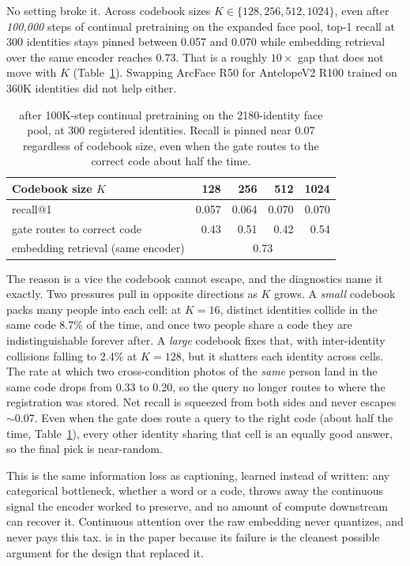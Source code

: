 No setting broke it. Across codebook sizes $K\in\{128,256,512,1024\}$, even after \emph{100{,}000} steps of continual pretraining on the expanded face pool, top-1 recall at 300 identities stays pinned between 0.057 and 0.070 while embedding retrieval over the same encoder reaches 0.73. That is a roughly $10\times$ gap that does not move with $K$ (Table~\ref{tab:patha}). Swapping ArcFace R50 for AntelopeV2 R100 trained on 360K identities did not help either.

\begin{table}[h]
\small\centering
\caption{\patha{} after 100K-step continual pretraining on the 2180-identity face pool, at 300 registered identities. Recall is pinned near 0.07 regardless of codebook size, even when the gate routes to the correct code about half the time.}
\label{tab:patha}
\begin{tabular}{@{}lrrrr@{}}
\toprule
\textbf{Codebook size $K$} & 128 & 256 & 512 & 1024 \\
\midrule
\patha{} recall@1            & 0.057 & 0.064 & 0.070 & 0.070 \\
gate routes to correct code  & 0.43  & 0.51  & 0.42  & 0.54  \\
embedding retrieval (same encoder) & \multicolumn{4}{c}{0.73} \\
\bottomrule
\end{tabular}
\end{table}

The reason is a vice the codebook cannot escape, and the diagnostics name it exactly. Two pressures pull in opposite directions as $K$ grows. A \emph{small} codebook packs many people into each cell: at $K{=}16$, distinct identities collide in the same code 8.7\% of the time, and once two people share a code they are indistinguishable forever after. A \emph{large} codebook fixes that, with inter-identity collisions falling to 2.4\% at $K{=}128$, but it shatters each identity across cells. The rate at which two cross-condition photos of the \emph{same} person land in the same code drops from 0.33 to 0.20, so the query no longer routes to where the registration was stored. Net recall is squeezed from both sides and never escapes $\sim$0.07. Even when the gate does route a query to the right code (about half the time, Table~\ref{tab:patha}), every other identity sharing that cell is an equally good answer, so the final pick is near-random.

This is the same information loss as captioning, learned instead of written: any categorical bottleneck, whether a word or a code, throws away the continuous signal the encoder worked to preserve, and no amount of compute downstream can recover it. Continuous attention over the raw embedding never quantizes, and never pays this tax. \patha{} is in the paper because its failure is the cleanest possible argument for the design that replaced it.
